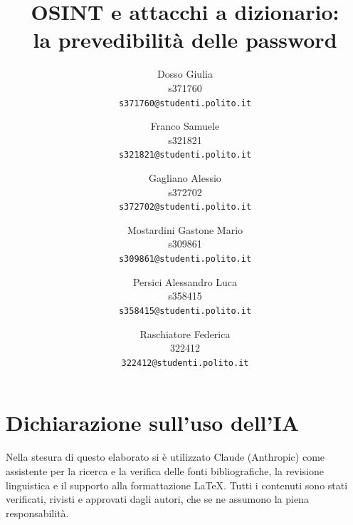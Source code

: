 \documentclass[10pt,twocolumn,letterpaper]{article}
\title{OSINT e attacchi a dizionario:\\
la prevedibilità delle password}
\author{
Dosso Giulia\\
s371760\\
{\tt\small s371760@studenti.polito.it}
\and
Franco Samuele\\
s321821\\
{\tt\small s321821@studenti.polito.it}
\and
Gagliano Alessio\\
s372702\\
{\tt\small s372702@studenti.polito.it}
\and
Mostardini Gastone Mario\\
s309861\\
{\tt\small s309861@studenti.polito.it}
\and
Persici Alessandro Luca\\
s358415\\
{\tt\small s358415@studenti.polito.it}
\and
Raschiatore Federica\\
322412\\
{\tt\small 322412@studenti.polito.it}
}
\begin{document}
\onecolumn
\maketitle
\tableofcontents
\vspace{15pt}
\twocolumn







\section*{Dichiarazione sull'uso dell'IA}
Nella stesura di questo elaborato si è utilizzato Claude (Anthropic) come assistente
per la ricerca e la verifica delle fonti bibliografiche, la revisione linguistica e il
supporto alla formattazione \LaTeX{}. Tutti i contenuti sono stati verificati,
rivisti e approvati dagli autori, che se ne assumono la piena responsabilità.
{
    \small
    
    
}

\onecolumn %
\appendix


% 
\end{document}
